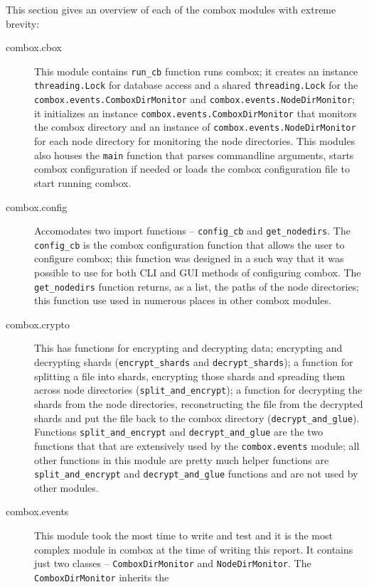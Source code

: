 This section gives an overview of each of the combox modules with
extreme brevity:

\begin{description}
\item[combox.cbox] This module contains \verb+run_cb+ function runs
  combox; it creates an instance \verb+threading.Lock+ for database
  access and a shared \verb+threading.Lock+ for the
  \verb+combox.events.ComboxDirMonitor+ and
  \verb+combox.events.NodeDirMonitor+; it initializes an instance
  \verb+combox.events.ComboxDirMonitor+ that monitors the combox
  directory and an instance of \verb+combox.events.NodeDirMonitor+ for
  each node directory for monitoring the node directories. This
  modules also houses the \verb+main+ function that parses commandline
  arguments, starts combox configuration if needed or loads the combox
  configuration file to start running combox.
\item[combox.config] Accomodates two import functions --
  \verb+config_cb+ and \verb+get_nodedirs+. The \verb+config_cb+ is
  the combox configuration function that allows the user to configure
  combox; this function was designed in a such way that it was
  possible to use for both CLI and GUI methods of configuring
  combox. The \verb+get_nodedirs+ function returns, as a list, the
  paths of the node directories; this function use used in numerous
  places in other combox modules.
\item[combox.crypto] This has functions for encrypting and decrypting
  data; encrypting and decrypting shards (\verb+encrypt_shards+ and
  \verb+decrypt_shards+); a function for splitting a file into shards,
  encrypting those shards and spreading them across node directories
  (\verb+split_and_encrypt+); a function for decrypting the shards
  from the node directories, reconstructing the file from the
  decrypted shards and put the file back to the combox directory
  (\verb+decrypt_and_glue+). Functions \verb+split_and_encrypt+ and
  \verb+decrypt_and_glue+ are the two functions that that are
  extensively used by the \verb+combox.events+ module; all other
  functions in this module are pretty much helper functions are
  \verb+split_and_encrypt+ and \verb+decrypt_and_glue+ functions and
  are not used by other modules.
\item[combox.events] This module took the most time to write and test
  and it is the most complex module in combox at the time of writing
  this report. It contains just two classes -- \verb+ComboxDirMonitor+
  and \verb+NodeDirMonitor+. The \verb+ComboxDirMonitor+ inherits the

\end{description}
